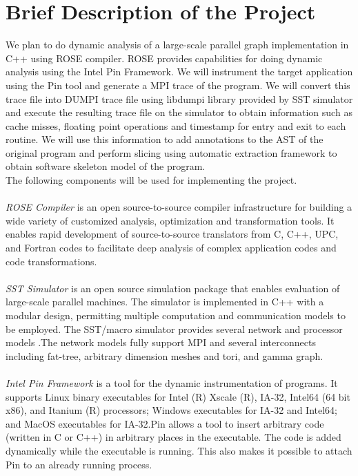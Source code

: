 \documentclass[preprint, cm, 10pt]{sigplanconf}
\begin{document}
\section*{Brief Description of the Project}
We plan to do dynamic analysis of a large-scale parallel graph implementation in C++ using ROSE compiler. ROSE provides capabilities for doing dynamic analysis using the Intel Pin Framework. We will instrument the target application using the Pin tool and generate a MPI trace of the program. We will convert this trace file into DUMPI trace file using libdumpi library provided by SST simulator and execute the resulting trace file on the simulator to obtain information such as cache misses, floating point operations and timestamp for entry and exit to each routine. We will use this information to add annotations to the AST of the original program and perform slicing using automatic extraction framework to obtain software skeleton model of the program. 
\\
The following components will be used for implementing the project.
\\
\\
{\it ROSE Compiler} \cite{Rose}  is an open source-to-source compiler infrastructure for building a wide variety of customized analysis, optimization and transformation tools. It enables rapid development of source-to-source translators from C, C++, UPC, and Fortran codes to facilitate deep analysis of complex application codes and code transformations.
\\
\\
{\it SST Simulator} \cite{Sandia}  is an open source simulation package that enables evaluation of large-scale parallel machines. The simulator is implemented in C++ \cite{Stroustrup00} with a modular design, permitting multiple computation and communication models to be employed. The SST/macro simulator provides several network and processor models \cite{Janssen10}.The network models fully support MPI and several interconnects including fat-tree, arbitrary dimension meshes and tori, and gamma graph.
\\
\\
{\it Intel Pin Framework} \cite{Pin} is a tool for the dynamic instrumentation of programs. It supports Linux binary executables for Intel (R) Xscale (R), IA-32, Intel64 (64 bit x86), and Itanium (R) processors; Windows executables for IA-32 and Intel64; and MacOS executables for IA-32.Pin allows a tool to insert arbitrary code (written in C or C++) in arbitrary places in the executable. The code is added dynamically while the executable is running. This also makes it possible to attach Pin to an already running process.
\end{document}
